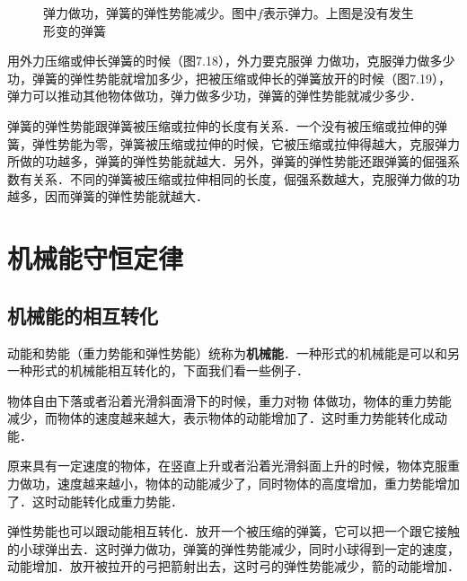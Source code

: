 \begin{figure}[H]
\begin{floatrow}
{
        }{\caption{弹力做功，弹簧的弹性势能减少。图中$f$表示弹力。上图是没有发生形变的弹簧}}
    \end{floatrow}
\end{figure}
用外力压缩或伸长弹簧的时候（图7.18），外力要克服弹
力做功，克服弹力做多少功，弹簧的弹性势能就增加多少，把被压缩或伸长的弹簧放开的时候（图7.19），弹力可以推动其他物体做功，弹力做多少功，弹簧的弹性势能就减少多少．

弹簧的弹性势能跟弹簧被压缩或拉伸的长度有关系．一个没有被压缩或拉伸的弹簧，弹性势能为零，弹簧被压缩或拉伸的时候，它被压缩或拉伸得越大，克服弹力所做的功越多，弹簧的弹性势能就越大．另外，弹簧的弹性势能还跟弹簧的倔强系数有关系．不同的弹簧被压缩或拉伸相同的长度，倔强系数越大，克服弹力做的功越多，因而弹簧的弹性势能就越大．
\newpage
\section{机械能守恒定律}
\subsection{机械能的相互转化}

动能和势能（重力势能和弹性势能）统称为\textbf{机械能}．一种形式的机械能是可以和另一种形式的机械能相互转化的，下面我们看一些例子．

物体自由下落或者沿着光滑斜面滑下的时候，重力对物
体做功，物体的重力势能减少，而物体的速度越来越大，表示物体的动能增加了．这时重力势能转化成动能．

原来具有一定速度的物体，在竖直上升或者沿着光滑斜面上升的时候，物体克服重力做功，速度越来越小，物体的动能减少了，同时物体的高度增加，重力势能增加了．这时动能转化成重力势能．

弹性势能也可以跟动能相互转化．放开一个被压缩的弹簧，它可以把一个跟它接触的小球弹出去．这时弹力做功，弹簧的弹性势能减少，同时小球得到一定的速度，动能增加．放开被拉开的弓把箭射出去，这时弓的弹性势能减少，箭的动能增加．

